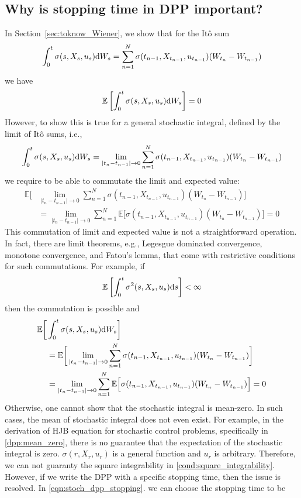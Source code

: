 \documentclass[11pt]{book}
\newcommand{\ds}{\text{\normalfont d}s}
\newcommand{\dW}{\text{\normalfont d}W}
\begin{document}
\subsection{Why is stopping time in DPP important?}
In Section~\ref{sec:toknow_Wiener}, we show that for the Itô sum
\[
\int_0^t \sigma(s,X_s,u_s)\dW_s = \sum_{n=1}^{N} \sigma(t_{n-1},X_{t_{n-1}},u_{t_{n-1}})(W_{t_{n}}-W_{t_{n-1}}) 
\]
we have
\[
\mathbb{E}\left[\int_0^t \sigma(s,X_s,u_s)\dW_s\right]=0
\]
However, to show this is true for a general stochastic integral, defined by the limit of Itô sums, i.e., 
\begin{equation*}
\int_0^t \sigma(s,X_s,u_s)\dW_s = \lim_{|t_n-t_{n-1}|\to0}\sum_{n=1}^{N} \sigma(t_{n-1},X_{t_{n-1}},u_{t_{n-1}})(W_{t_{n}}-W_{t_{n-1}})    
\end{equation*}
we require to be able to commutate the limit and expected value: 
\[
\begin{split}
    \mathbb{E}\bigg[&\lim_{|t_n-t_{n-1}|\to0}\sum_{n=1}^{N} \sigma(t_{n-1},X_{t_{n-1}},u_{t_{n-1}})(W_{t_{n}}-W_{t_{n-1}}) \bigg]\\
    &=\lim_{|t_n-t_{n-1}|\to0}\sum_{n=1}^{N} \mathbb{E}\Big[\sigma(t_{n-1},X_{t_{n-1}},u_{t_{n-1}})(W_{t_{n}}-W_{t_{n-1}})\Big]=0
\end{split}
\]
This commutation of limit and expected value is not a straightforward operation. In fact, there are limit theorems, e.g., Legesgue dominated convergence, monotone convergence, and Fatou's lemma, that come with restrictive conditions for such commutations.
For example, if 
\begin{equation}\label{cond:square_integrability}
    \mathbb{E}\left[\int_0^t \sigma^2(s,X_s,u_s)\ds\right]<\infty
\end{equation}
then the commutation is possible and 
\[
\begin{split}
\mathbb{E}\bigg[&\int_0^t \sigma(s,X_s,u_s)\dW_s\bigg]\\
    &=\mathbb{E}\bigg[\lim_{|t_n-t_{n-1}|\to0}\sum_{n=1}^{N} \sigma(t_{n-1},X_{t_{n-1}},u_{t_{n-1}})(W_{t_{n}}-W_{t_{n-1}}) \bigg]\\
    &=\lim_{|t_n-t_{n-1}|\to0}\sum_{n=1}^{N} \mathbb{E}\Big[\sigma(t_{n-1},X_{t_{n-1}},u_{t_{n-1}})(W_{t_{n}}-W_{t_{n-1}})\Big]=0
\end{split}
\]
Otherwise, one cannot show that the stochastic integral is mean-zero. In such cases, the mean of stochastic integral does not even exist. For example, in the derivation of HJB equation for stochastic control problems, specifically in \eqref{dpp:mean_zero}, there is no guarantee that the expectation of the stochastic integral is zero. $\sigma(r,X_r,u_r)$ is a general function and $u_r$ is arbitrary. Therefore, we can not guaranty the square integrability  in \eqref{cond:square_integrability}. However, if we write the DPP with a specific stopping time, then the issue is resolved. In \eqref{eqn:stoch_dpp_stopping}. we can choose the stopping time to be
\end{document}
